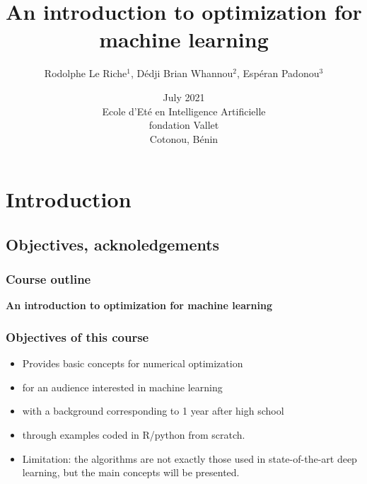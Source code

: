 \documentclass[12pt]{beamer}
\begin{document}
\title
[~Optimization for machine learning
]
{An introduction to optimization for machine learning}
\author
[Le Riche et al.]
{\large Rodolphe Le Riche$^1$, Dédji Brian Whannou$^2$, Espéran Padonou$^3$} 
\date[July 2021]{July 2021 \\
Ecole d'Eté en Intelligence Artificielle \\
fondation Vallet\\
Cotonou, Bénin} 
\begin{frame}
\titlepage
\end{frame}

\section{Introduction}
\subsection{Objectives, acknoledgements}

\begin{frame}%
\frametitle{Course outline} 
\begin{center} \textbf{An introduction to optimization for machine learning} \end{center}
\tableofcontents[currentsection]
\end{frame}

\begin{frame}
\frametitle{Objectives of this course}
\begin{itemize}
\item Provides basic concepts for numerical optimization
\item for an audience interested in machine learning
\item with a background corresponding to 1 year after high school
\item through examples coded in R/python from scratch.
\item Limitation: the algorithms are not exactly those used in state-of-the-art deep learning, but the main concepts will be presented.
\end{itemize}
\end{frame}
\end{document}
